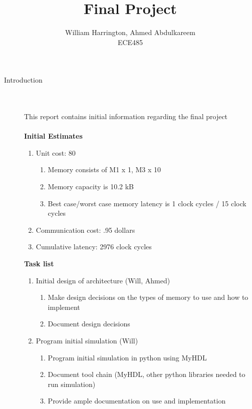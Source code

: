 \documentclass[12pt]{article}
\begin{document}
\title{Final Project}%
\author{William Harrington, Ahmed Abdulkareem\\ %
ECE485} %
 
\maketitle
\begin{description}
	\item[Introduction] \hfill \\ \\
		This report contains initial information regarding the final project \\ \\
		\textbf{Initial Estimates}
		\begin{enumerate}
			\item Unit cost: 80
			\begin{enumerate}
				\item Memory consists of M1 x 1, M3 x 10
				\item Memory capacity is 10.2 kB
				\item Best case/worst case memory latency is 1 clock cycles / 15 clock cycles
			\end{enumerate}
			\item Communication cost: .95 dollars
			\item Cumulative latency: 2976 clock cycles
		\end{enumerate}
		\textbf{Task list}
		\begin{enumerate}
			\item Initial design of architecture (Will, Ahmed)
			\begin{enumerate}
				\item Make design decisions on the types of memory to use and how to implement
				\item Document design decisions
			\end{enumerate}
			\item Program initial simulation (Will)
			\begin{enumerate}
				\item Program initial simulation in python using MyHDL
				\item Document tool chain (MyHDL, other python libraries needed to run simulation)
				\item Provide ample documentation on use and implementation
			\end{enumerate}

\end{enumerate}
\end{description}
\end{document}
